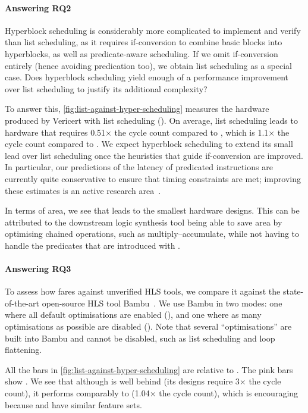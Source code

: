 \paragraph{Answering RQ2}
Hyperblock scheduling is considerably more complicated to implement and verify than list scheduling, as it requires if-conversion to combine basic blocks into hyperblocks, as well as predicate-aware scheduling. If we omit if-conversion entirely (hence avoiding predication too), we obtain list scheduling as a special case. Does hyperblock scheduling yield enough of a performance improvement over list scheduling to justify its additional complexity?

To answer this, \cref{fig:list-against-hyper-scheduling} measures the hardware produced by Vericert with list scheduling (\VericertList{}). On average, list scheduling leads to hardware that requires 0.51$\times$ the cycle count compared to \VericertBase{}, which is 1.1$\times$ the cycle count compared to \VericertHyper{}. We expect hyperblock scheduling to extend its small lead over list scheduling once the heuristics that guide if-conversion are improved.  In particular, our predictions of the latency of predicated instructions are currently quite conservative to ensure that timing constraints are met; improving these estimates is an active research area~\cite{tan15_mappin_lut_fpgas,rizzi23_iterat_method_mappin_aware_frequen,wang23_mapbuf,ustun20_accur_fpga_hls,zheng14_fast_effec_placem_routin_direc}.

In terms of area, we see that \VericertList{} leads to the smallest hardware designs. This can be attributed to the downstream logic synthesis tool being able to save area by optimising chained operations, such as multiply--accumulate, while not having to handle the predicates that are introduced with \VericertHyper{}.

\paragraph{Answering RQ3}
To assess how \VericertHyper{} fares against unverified HLS tools, we compare it
against the state-of-the-art open-source HLS tool
Bambu~\cite[]{ferrandi21_bambu}. We use Bambu in two modes: one where all
default optimisations are enabled (\BambuDefault{}), and one where as many
optimisations as possible are disabled (\BambuNoOpt{}). Note that several
\enquote{optimisations} are built into Bambu and cannot be disabled, such as
list scheduling and loop flattening.

All the bars in \cref{fig:list-against-hyper-scheduling} are relative to \BambuDefault. The pink bars show \BambuNoOpt. We see that although \VericertHyper{} is well behind \BambuDefault{} (its designs require 3$\times$ the cycle count), it performs comparably to \BambuNoOpt{} (1.04$\times$ the cycle count), which is encouraging because \VericertHyper{} and \BambuNoOpt{} have similar feature sets.


